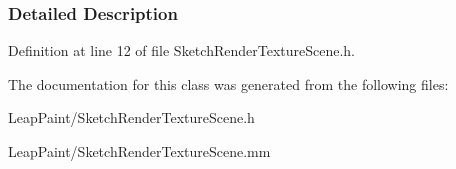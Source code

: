 \subsubsection{Detailed Description}


Definition at line 12 of file Sketch\-Render\-Texture\-Scene.\-h.



The documentation for this class was generated from the following files\-:\begin{DoxyCompactItemize}
\item 
Leap\-Paint/Sketch\-Render\-Texture\-Scene.\-h\item 
Leap\-Paint/Sketch\-Render\-Texture\-Scene.\-mm\end{DoxyCompactItemize}
